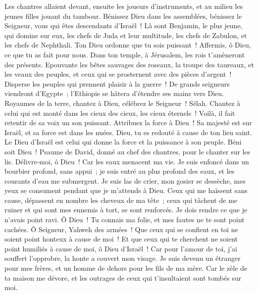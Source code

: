 \begin{multicols}{2}
Les chantres allaient devant, ensuite les joueurs d'instruments, et au milieu les jeunes filles jouant du tambour.
Bénissez Dieu dans les assemblées, bénissez le Seigneur, vous qui êtes descendants d'Israël~!
Là sont Benjamin, le plus jeune, qui domine sur eux, les chefs de Juda et leur multitude, les chefs de Zabulon, et les chefs de Nephthali.
Ton Dieu ordonne que tu sois puissant~! Affermis, ô Dieu, ce que tu as fait pour nous.
Dans ton temple, à Jérusalem, les rois t'amèneront des présents.
Epouvante les bêtes sauvages des roseaux, la troupe des taureaux, et les veaux des peuples, et ceux qui se prosternent avec des pièces d'argent~! Disperse les peuples qui prennent plaisir à la guerre~!
De grands seigneurs viendront d'Egypte~; l'Ethiopie se hâtera d'étendre ses mains vers Dieu.
Royaumes de la terre, chantez à Dieu, célébrez le Seigneur~! Sélah.
Chantez à celui qui est monté dans les cieux des cieux, les cieux éternels~! Voilà, il fait retentir de sa voix un son puissant.
Attribuez la force à Dieu~! Sa majesté est sur Israël, et sa force est dans les nuées.
Dieu, tu es redouté à cause de ton lieu saint. Le Dieu d'Israël est celui qui donne la force et la puissance à son peuple. Béni soit Dieu~!
\VerseOne{}Psaume de David, donné au chef des chantres, pour le chanter sur les lis.
Délivre-moi, ô Dieu~! Car les eaux menacent ma vie.
Je suis enfoncé dans un bourbier profond, sans appui~; je suis entré au plus profond des eaux, et les courants d'eau me submergent.
Je suis las de crier, mon gosier se dessèche, mes yeux se consument pendant que je m'attends à Dieu.
Ceux qui me haïssent sans cause, dépassent en nombre les cheveux de ma tête~; ceux qui tâchent de me ruiner et qui sont mes ennemis à tort, se sont renforcés. Je dois rendre ce que je n'avais point ravi.
Ô Dieu~! Tu connais ma folie, et mes fautes ne te sont point cachées.
Ô Seigneur, Yahweh des armées~! Que ceux qui se confient en toi ne soient point honteux à cause de moi~! Et que ceux qui te cherchent ne soient point humiliés à cause de moi, ô Dieu d'Israël~!
Car pour l'amour de toi, j'ai souffert l'opprobre, la honte a couvert mon visage.
Je suis devenu un étranger pour mes frères, et un homme de dehors pour les fils de ma mère.
Car le zèle de ta maison me dévore, et les outrages de ceux qui t'insultaient sont tombés sur moi.

\end{multicols}
